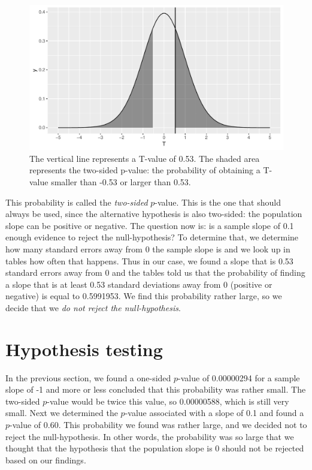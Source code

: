 \documentclass[]{report}\usepackage[]{graphicx}\usepackage[]{color}
\makeatletter
\def\maxwidth{ %
  \ifdim\Gin@nat@width>\linewidth
    \linewidth
  \else
    \Gin@nat@width
  \fi
}
\newenvironment{knitrout}{}{} %
\makeatother
\begin{document}
\begin{knitrout}
\color{fgcolor}\begin{figure}

{\centering \includegraphics[width=\maxwidth]{figure/inf_19-1} 

}

\caption[The vertical line represents a T-value of 0.53]{The vertical line represents a T-value of 0.53. The shaded area represents the two-sided p-value: the probability of obtaining a T-value smaller than -0.53 or larger than 0.53.}\label{fig:inf_19}
\end{figure}


\end{knitrout}

This probability is called the \textit{two-sided} $p$-value. This is the one that should always be used, since the alternative hypothesis is also two-sided: the population slope can be positive or negative. The question now is: is a sample slope of 0.1 enough evidence to reject the null-hypothesis? To determine that, we determine how many standard errors away from 0 the sample slope is and we look up in tables how often that happens. Thus in our case, we found a slope that is 0.53 standard errors away from 0 and the tables told us that the probability of finding a slope that is at least 0.53 standard deviations away from 0 (positive or negative) is equal to 0.5991953. We find this probability rather large, so we decide that we \textit{do not reject the null-hypothesis}.


\section{Hypothesis testing}

In the previous section, we found a one-sided $p$-value of 0.00000294 for a sample slope of -1 and more or less concluded that this probability was rather small. The two-sided $p$-value would be twice this value, so 0.00000588, which is still very small. Next we determined the $p$-value associated with a slope of 0.1 and found a $p$-value of 0.60. This probability we found was rather large, and we decided not to reject the null-hypothesis. In other words, the probability was so large that we thought that the hypothesis that the population slope is 0 should not be rejected based on our findings.
\end{document}
